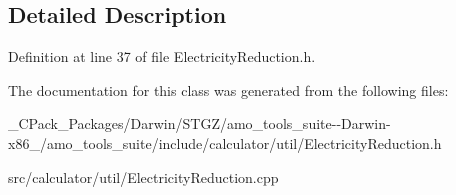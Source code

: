 \subsection{Detailed Description}


Definition at line 37 of file Electricity\+Reduction.\+h.



The documentation for this class was generated from the following files\+:\begin{DoxyCompactItemize}
\item 
\+\_\+\+C\+Pack\+\_\+\+Packages/\+Darwin/\+S\+T\+G\+Z/amo\+\_\+tools\+\_\+suite-\/-\/\+Darwin-\/x86\+\_/amo\+\_\+tools\+\_\+suite/include/calculator/util/Electricity\+Reduction.\+h\item 
src/calculator/util/Electricity\+Reduction.\+cpp\end{DoxyCompactItemize}
